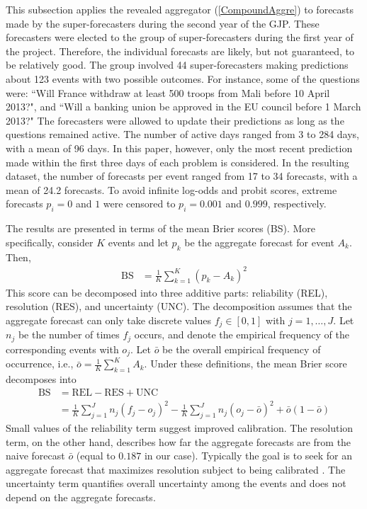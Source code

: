 \documentclass[12pt]{article}
\theoremstyle{definition}
\theoremstyle{definition}
\begin{document}
This subsection applies the revealed aggregator (\ref{CompoundAggre})
to forecasts made by the super-forecasters during the second year of the GJP. These forecasters were
elected to the group of super-forecasters during the first year of the project. 
Therefore, the individual forecasts are
likely, but not guaranteed, to be relatively good. The group involved 44 super-forecasters making predictions about  123 events with two possible outcomes. For instance, some of
the questions were: ``Will France withdraw at least 500 troops from Mali before 10 April 2013?", and ``Will a banking union be approved in the EU council before 1 March 2013?"  The forecasters were allowed to update their predictions as long as the
questions remained active. 
The number of active days ranged from 3 to 284 days, with a mean of 96 days. 
In this paper, however, only the most recent prediction made within the first three days of each problem is considered.  
In the resulting
dataset, the number of forecasts per event ranged from 17 to 34
forecasts, with a mean of 24.2 forecasts. To avoid infinite log-odds
and probit scores, extreme forecasts $p_i = 0$ and $1$ were
censored to $p_i = 0.001$ and $0.999$, respectively.
 
 
The results are presented in terms of the mean Brier scores (BS). More specifically, consider $K$
events and let $p_k$ be the aggregate forecast for event $A_k$. Then,
 \begin{align*}
\text{BS} &= \frac{1}{K} \sum_{k=1}^K (p_k - A_k)^2
 \end{align*}
 This score can be decomposed into three additive parts: reliability (REL),
resolution (RES), and uncertainty (UNC). The decomposition assumes
that the aggregate forecast can only take discrete values $f_j \in
[0,1]$ with $j = 1, \dots, J$. Let $n_j$ be the number of times $f_j$
occurs, and denote the empirical frequency of the corresponding events
with $o_j$.  Let $\bar{o}$ be the overall empirical frequency of
occurrence, i.e., $\bar{o} = \frac{1}{K} \sum_{k=1}^K A_k$. Under these definitions, the
mean Brier score decomposes into
 \begin{align*}
\text{BS} &= \text{REL} - \text{RES} + \text{UNC}\\
&= \frac{1}{K} \sum_{j=1}^J n_j (f_j - o_j)^2 - \frac{1}{K} \sum_{j=1}^J n_j (o_j - \bar{o})^2 + \bar{o}(1-\bar{o})
 \end{align*}
 Small values of the reliability term suggest improved
calibration. The resolution term, on the other hand, describes how far
the aggregate forecasts are from the naive forecast $\bar{o}$ (equal to $0.187$ in our case). Typically the goal is
to seek for an aggregate forecast that maximizes resolution subject to
being calibrated \citep{Ranjan08}. The
uncertainty term quantifies overall uncertainty among the events and
does not depend on the aggregate forecasts.
 
\end{document}
